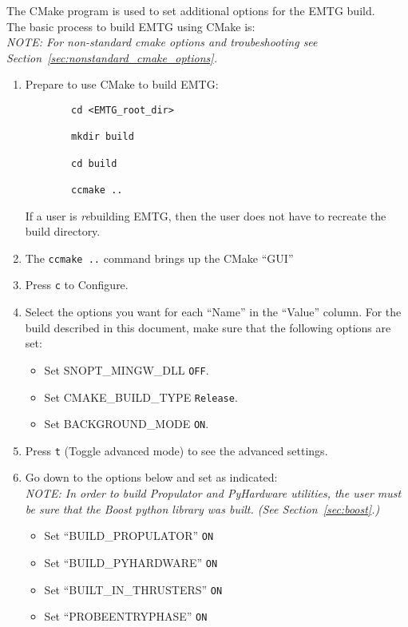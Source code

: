 
The CMake program is used to set additional options for the \ac{EMTG} build. \\
The basic process to build \ac{EMTG} using CMake is: \\
\emph{NOTE: For non-standard cmake options and troubeshooting see Section~\ref{sec:nonstandard_cmake_options}.}

\begin{enumerate}
	\item Prepare to use CMake to build EMTG:
		\begin{verbatim}
		cd <EMTG_root_dir>

		mkdir build

		cd build

		ccmake ..
		\end{verbatim}
	
	If a user is \emph{re}building \ac{EMTG}, then the user does not have to recreate the build directory.
	\item The \texttt{ccmake ..} command brings up the CMake ``\ac{GUI}''
	\item Press \texttt{c} to Configure.
	\item Select the options you want for each ``Name'' in the ``Value'' column. For the build described in this document, make sure that the following options are set:
		\begin{itemize}
			\item Set SNOPT\_MINGW\_DLL \texttt{OFF}.
			\item Set CMAKE\_BUILD\_TYPE \texttt{Release}.
			\item Set BACKGROUND\_MODE \texttt{ON}.
		\end{itemize}
	\item Press \texttt{t} (Toggle advanced mode) to see the advanced settings.
	\item Go down to the options below and set as indicated: \\
	\emph{NOTE: In order to build Propulator and PyHardware utilities, the user must be sure that the Boost python library was built. (See Section~\ref{sec:boost}.) }
	
		\begin{itemize}
			\item Set ``BUILD\_PROPULATOR'' \texttt{ON} 
			\item Set ``BUILD\_PYHARDWARE'' \texttt{ON}
			\item Set ``BUILT\_IN\_THRUSTERS'' \texttt{ON}
			\item Set ``PROBEENTRYPHASE'' \texttt{ON}
		\end{itemize}


\end{enumerate}
